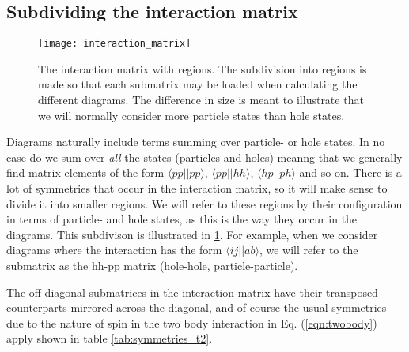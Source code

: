 \subsection{Subdividing the interaction matrix}


\begin{figure}[hbtp]
    \centering
    \texttt{[image: interaction\_matrix]}
    \caption{The interaction matrix with regions. The subdivision into regions is made so that each submatrix may be loaded when calculating the different diagrams. The difference in size is meant to illustrate that we will normally consider more particle states than hole states.}
    \label{fig:interaction_matrix}
\end{figure}


Diagrams naturally include terms summing over particle- or hole
states. In no case do we sum over \emph{all} the states (particles and
holes) meanng that we generally find matrix elements of the form $\langle pp
\vert \vert pp \rangle $, $\langle pp \vert \vert hh \rangle $,
$\langle hp \vert \vert ph \rangle $ and so on.  There is a lot of
symmetries that occur in the interaction matrix, so it will make sense
to divide it into smaller regions. We will refer to these regions by
their configuration in terms of particle- and hole states, as this is
the way they occur in the diagrams. This subdivison is illustrated in
\ref{fig:interaction_matrix}. For example, when we consider diagrams
where the interaction has the form $\langle i j \vert \vert a
b\rangle$, we will refer to the submatrix as the hh-pp matrix
(hole-hole, particle-particle).

The off-diagonal submatrices in the interaction matrix have their
transposed counterparts mirrored across the diagonal, and of course
the usual symmetries due to the nature of spin in the two body
interaction in Eq. (\ref{eqn:twobody}) apply shown in table
\ref{tab:symmetries_t2}.



